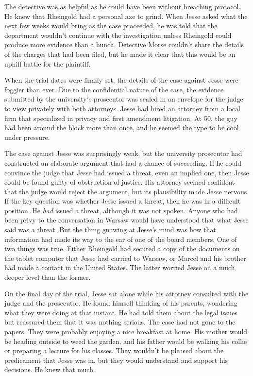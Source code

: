 \documentclass[12pt]{book}
\begin{document}
The detective was as helpful as he could have been without breaching protocol.  He knew that Rheingold had a personal axe to grind.  When Jesse asked what the next few weeks would bring as the case proceeded, he was told that the department wouldn't continue with the investigation unless Rheingold could produce more evidence than a hunch.  Detective Morse couldn't share the details of the charges that had been filed, but he made it clear that this would be an uphill battle for the plaintiff.


When the trial dates were finally set, the details of the case against Jesse were foggier than ever.  Due to the confidential nature of the case, the evidence submitted by the university's prosecutor was sealed in an envelope for the judge to view privately with both attorneys.  Jesse had hired an attorney from a local firm that specialized in privacy and first amendment litigation.  At 50, the guy had been around the block more than once, and he seemed the type to be cool under pressure.

The case against Jesse was surprisingly weak, but the university prosecutor had constructed an elaborate argument that had a chance of succeeding.  If he could convince the judge that Jesse had issued a threat, even an implied one, then Jesse could be found guilty of obstruction of justice.  His attorney seemed confident that the judge would reject the argument, but its plausibility made Jesse nervous.  If the key question was whether Jesse issued a threat, then he was in a difficult position.  He \emph{had} issued a threat, although it was not spoken.  Anyone who had been privy to the conversation in Warsaw would have understood that what Jesse said was a threat.  But the thing gnawing at Jesse's mind was how that information had made its way to the ear of one of the board members.  One of two things was true.  Either Rheingold had secured a copy of the documents on the tablet computer that Jesse had carried to Warsaw, or Marcel and his brother had made a contact in the United States.  The latter worried Jesse on a much deeper level than the former.

On the final day of the trial, Jesse sat alone while his attorney consulted with the judge and the prosecutor.  He found himself thinking of his parents, wondering what they were doing at that instant.  He had told them about the legal issues but reassured them that it was nothing serious.  The case had not gone to the papers.  They were probably enjoying a nice breakfast at home.  His mother would be heading outside to weed the garden, and his father would be walking his collie or preparing a lecture for his classes.  They wouldn't be pleased about the predicament that Jesse was in, but they would understand and support his decisions.  He knew that much.
\end{document}
